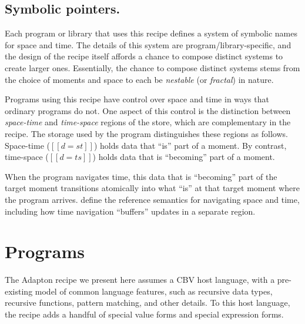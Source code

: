 \documentclass[11pt]{article}
\begin{document}
\subsection{Symbolic pointers.}
\label{sec:symbolic-pointers}

Each program or library that uses this recipe
defines a system of symbolic names for space and time.
The details of this system are program/library-specific, and the
design of the recipe itself affords a chance to compose distinct systems to
create larger ones.
Essentially, the chance to compose distinct systems stems from the choice of moments
and space to each be \emph{nestable} (or \emph{fractal}) in nature.

\nolinenumbers
\ottgrammartabular{
  {\makeLineNumber\stepLineNumber} \ottSpace
  \\
   {\makeLineNumber\stepLineNumber} \ottMoment
  \\
   {\makeLineNumber\stepLineNumber} \ottp
  \\
   {\makeLineNumber\stepLineNumber} \ottpp
  \\
  {\makeLineNumber\stepLineNumber} \ottd
}
\linenumbers

Programs using this recipe have control over space and time in ways
that ordinary programs do not.
%
One aspect of this control is the distinction between
\emph{space-time} and \emph{time-space} regions of the store, which are complementary in
the recipe.
%
The storage used by the program distinguishes these regions as follows.
%
Space-time ($[[d = st]]$) holds data that ``is'' part of a moment.
By contrast,
time-space ($[[d = ts]]$) holds data that is ``becoming'' part of a moment.

When the program navigates time, this data that is ``becoming'' part
of the target moment transitions atomically into what ``is'' at that
target moment where the program arrives.
%
define the reference semantics for navigating space and time, including
how time navigation ``buffers'' updates in a separate region.


\section{Programs}
\label{sec:programs}

The Adapton recipe we present here assumes a CBV host language, with a
pre-existing model of common language features, such as recursive data
types, recursive functions, pattern matching, and other details.
%
To this host language, the recipe adds a handful of special value
forms and special expression forms.
\end{document}

